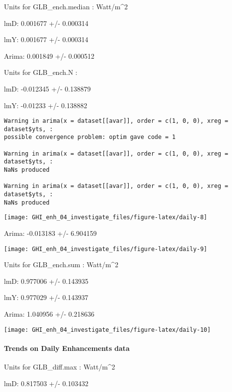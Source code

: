 \documentclass[
  10pt,
  a4paper,oneside]{article}
\begin{document}
Units for GLB\_ench.median : Watt/m\^{}2

lmD: 0.001677 +/- 0.000314

lmY: 0.001677 +/- 0.000314

Arima: 0.001849 +/- 0.000512

Units for GLB\_ench.N :

lmD: -0.012345 +/- 0.138879

lmY: -0.01233 +/- 0.138882

\begin{verbatim}
Warning in arima(x = dataset[[avar]], order = c(1, 0, 0), xreg = dataset$yts, :
possible convergence problem: optim gave code = 1

Warning in arima(x = dataset[[avar]], order = c(1, 0, 0), xreg = dataset$yts, :
NaNs produced

Warning in arima(x = dataset[[avar]], order = c(1, 0, 0), xreg = dataset$yts, :
NaNs produced
\end{verbatim}

\begin{center}\texttt{[image: GHI\_enh\_04\_investigate\_files/figure-latex/daily-8]} \end{center}

Arima: -0.013183 +/- 6.904159

\begin{center}\texttt{[image: GHI\_enh\_04\_investigate\_files/figure-latex/daily-9]} \end{center}

Units for GLB\_ench.sum : Watt/m\^{}2

lmD: 0.977006 +/- 0.143935

lmY: 0.977029 +/- 0.143937

Arima: 1.040956 +/- 0.218636

\begin{center}\texttt{[image: GHI\_enh\_04\_investigate\_files/figure-latex/daily-10]} \end{center}

\newpage

\hypertarget{trends-on-daily-enhancements-data}{%
\paragraph{Trends on Daily Enhancements data}\label{trends-on-daily-enhancements-data}}

Units for GLB\_diff.max : Watt/m\^{}2

lmD: 0.817503 +/- 0.103432
\end{document}
